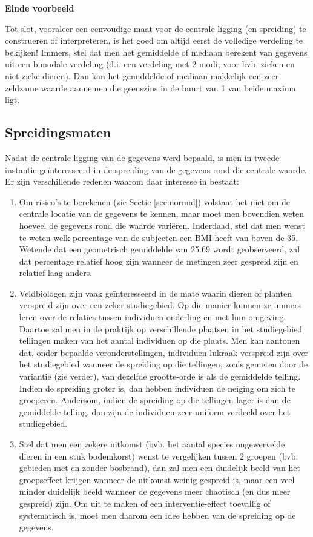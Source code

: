 \documentclass[
  12pt,dutch,coursenotes]{book}
\providecommand{\tightlist}{%
  \setlength{\itemsep}{0pt}\setlength{\parskip}{0pt}}
\theoremstyle{definition}
\theoremstyle{definition}
\theoremstyle{definition}
\theoremstyle{definition}
\theoremstyle{remark}
\begin{document}
\textbf{Einde voorbeeld}

Tot slot, vooraleer een eenvoudige maat voor de centrale ligging (en
spreiding) te construeren of interpreteren, is het goed om altijd eerst de
volledige verdeling te bekijken! Immers, stel dat men het gemiddelde of
mediaan berekent van gegevens uit een bimodale verdeling (d.i. een verdeling
met 2 modi, voor bvb. zieken en niet-zieke dieren). Dan kan het gemiddelde of
mediaan makkelijk een zeer zeldzame waarde aannemen die geenszins in de
buurt van 1 van beide maxima ligt.

\hypertarget{subsec:spreiding}{%
\subsection{Spreidingsmaten}\label{subsec:spreiding}}

Nadat de centrale ligging van de gegevens werd bepaald, is men in tweede
instantie geïnteresseerd in de spreiding van de gegevens rond
die centrale waarde. Er zijn verschillende redenen waarom daar interesse in bestaat:

\begin{enumerate}
\def\labelenumi{\arabic{enumi}.}
\tightlist
\item
  Om risico's te berekenen (zie Sectie \ref{sec:normal}) volstaat het niet om de centrale locatie van de gegevens te kennen, maar moet men bovendien weten hoeveel de gegevens rond die waarde variëren. Inderdaad, stel dat men wenst te weten welk percentage van de subjecten een BMI heeft van boven de 35. Wetende dat een geometrisch gemiddelde van 25.69 wordt geobserveerd, zal dat percentage relatief hoog zijn wanneer de metingen zeer gespreid zijn en relatief laag anders.
\item
  Veldbiologen zijn vaak geïnteresseerd in de mate waarin dieren of planten verspreid zijn over een zeker studiegebied. Op die manier kunnen ze immers leren over de relaties tussen individuen onderling en met hun omgeving. Daartoe zal men in de praktijk op verschillende plaatsen in het studiegebied tellingen maken van het aantal individuen op die plaats. Men kan aantonen dat, onder bepaalde veronderstellingen, individuen lukraak verspreid zijn over het studiegebied wanneer de spreiding op die tellingen, zoals gemeten door de variantie (zie verder), van dezelfde grootte-orde is als de gemiddelde telling. Indien de spreiding groter is, dan hebben individuen de neiging om zich te groeperen. Andersom, indien de spreiding op die tellingen lager is dan de gemiddelde telling, dan zijn de individuen zeer uniform verdeeld over het studiegebied.
\item
  Stel dat men een zekere uitkomst (bvb. het aantal species ongewervelde dieren in een stuk bodemkorst) wenst te vergelijken tussen 2 groepen (bvb. gebieden met en zonder bosbrand), dan zal men een duidelijk beeld van het groepseffect krijgen wanneer de uitkomst weinig gespreid is, maar een veel minder duidelijk beeld wanneer de gegevens meer chaotisch (en dus meer gespreid) zijn. Om uit te maken of een interventie-effect toevallig of systematisch is, moet men daarom een idee hebben van de spreiding op de gegevens.
\end{enumerate}
\end{document}

